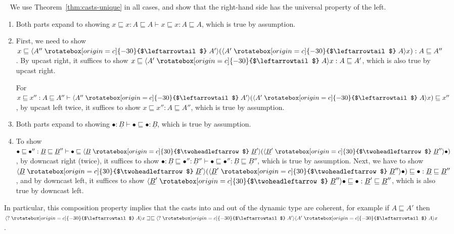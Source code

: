 \documentclass[acmsmall,nonacm]{acmart}
\renewcommand{\u}{\underline}
\newcommand{\ltdyn}{\sqsubseteq}
\newcommand{\gtdyn}{\sqsupseteq}
\newcommand{\equidyn}{\mathrel{\gtdyn\ltdyn}}
\newcommand{\dynv}{{?}}
\newcommand{\uarrow}{\mathrel{\rotatebox[origin=c]{-30}{$\leftarrowtail$}}}
\newcommand{\darrow}{\mathrel{\rotatebox[origin=c]{30}{$\twoheadleftarrow$}}}
\newcommand{\upcast}[2]{\langle{#2}\uarrow{#1}\rangle}
\newcommand{\dncast}[2]{\langle{#1}\darrow{#2}\rangle}
\begin{document}
\begin{longproof} ~
We use Theorem~\ref{thm:casts-unique} in all cases, and show that the
right-hand side has the universal property of the left.   
\begin{enumerate}
\item Both parts expand to showing 
  $x \ltdyn x : A \ltdyn A \vdash x \ltdyn x : A \ltdyn A$,
  which is true by assumption.
  
\item
  First, we need to show $x \ltdyn \upcast{A'}{A''}{(\upcast A{A'} x)} :
  A \ltdyn A''$.  By upcast right, it suffices to show $x \ltdyn
  \upcast{A}{A'}{x} : A \ltdyn A'$, which is also true by upcast right.

  For $x \ltdyn x'' : A \ltdyn A'' \vdash \upcast{A'}{A''}{(\upcast
    A{A'} x)} \ltdyn x''$, by upcast left twice, it suffices to show $x
  \ltdyn x'' : A \ltdyn A''$, which is true by assumption.
  
\item Both parts expand to showing $\bullet : \u B \vdash \bullet \ltdyn
  \bullet : \u B$, which is true by assumption.

\item
  To show $\bullet \ltdyn \bullet'' : \u B \ltdyn \u B'' \vdash \bullet
  \ltdyn \dncast{\u B}{\u B'}{(\dncast{\u B'}{\u B''} \bullet)}$, by
  downcast right (twice), it suffices to show $\bullet : \u B \ltdyn
  \bullet'' : \u B'' \vdash {\bullet} \ltdyn \bullet'' : \u B \ltdyn \u
  B''$, which is true by assumption.  Next, we have to show $\dncast{\u
    B}{\u B'}{(\dncast{\u B'}{\u B''} \bullet)} \ltdyn \bullet : \u B
  \ltdyn \u B''$, and by downcast left, it suffices to show $\dncast{\u
    B'}{\u B''}{\bullet} \ltdyn \bullet : \u B' \ltdyn \u B''$, which is
  also true by downcast left.
\end{enumerate}
\end{longproof}

\noindent In particular, this composition property implies that the casts into and
out of the dynamic type are coherent, for example if $A \ltdyn A'$
then
$\upcast{A}{\dynv}{x} \equidyn \upcast{A'}{\dynv}{\upcast{A}{A'}{x}}$.  
\end{document}
